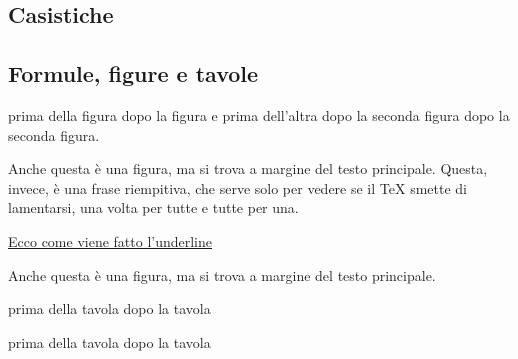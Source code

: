 \documentclass[12pt]{book}
\begin{document}
\subsection{Casistiche}
\par
{}
\par
{}
\par
{}
\par
{}
\par
{}
\par
{}
\par
{}
\par
{}
\par
\subsection{Formule, figure e tavole}

\par
{}
\par
{}
\par
prima della figura
dopo la figura e prima dell'altra
dopo la seconda figura
\Figskip{3.5 cm}
\Figskip{35 mm}
\Figskip{6cm}
dopo la seconda figura.
\par
Anche questa \`e una figura, ma si trova  a margine
del testo principale. Questa, invece, \`e una frase riempitiva, che
serve solo per vedere se il {\TeX} smette di lamentarsi, una volta per
tutte e tutte per una.\par
{}\par
{}\par
\underline{Ecco come viene fatto l'underline} \par
\LACs
\par
Anche questa \`e una figura, ma si trova 
a margine del testo principale.
\par
prima della tavola  dopo la tavola
\par
prima della tavola  dopo la tavola
\par
\end{document}
